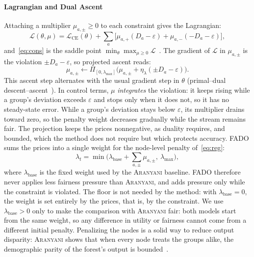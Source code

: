 \documentclass[conference]{IEEEtran}
\newcommand{\fado}{\textsc{FADO}}
\newcommand{\ara}{\textsc{Aranyani}}
\begin{document}
\paragraph*{Lagrangian and Dual Ascent}
Attaching a multiplier $\mu_{a,\pm}\ge0$ to each constraint gives the Lagrangian:
\begin{equation}
\mathcal{L}(\theta,\mu)=\mathcal{L}_{\mathrm{CE}}(\theta)+\sum_{a}\Big[\mu_{a,+}(D_a-\varepsilon)+\mu_{a,-}(-D_a-\varepsilon)\Big],
\end{equation}
and~\eqref{eq:cons} is the saddle point $\min_\theta\max_{\mu\ge0}\mathcal{L}$~\cite{boyd2004convex}. The gradient of $\mathcal{L}$ in $\mu_{a,\pm}$ is the
violation $\pm D_a-\varepsilon$, so projected ascent reads:
\begin{equation}
\mu_{a,\pm}\leftarrow\Pi_{[0,\lambda_{\max}]}\big(\mu_{a,\pm}+\eta_\lambda(\pm D_a-\varepsilon)\big).
\label{eq:dual}
\end{equation}
This ascent step alternates with the usual gradient step in $\theta$ (primal--dual descent--ascent~\cite{mahdavi2012trading}). In control terms, $\mu$ \emph{integrates} the
violation: it keeps rising while a group's deviation exceeds $\varepsilon$ and stops only when it does not, so it has no steady-state error. 
While a group's deviation stays below $\varepsilon$, its multiplier drains toward zero, so the penalty weight decreases gradually while the stream remains fair.
The projection keeps the prices nonnegative, as duality
requires, and bounded, which the method does not require but which protects accuracy. \fado{} sums the prices into a single weight for the node-level penalty of~\eqref{eq:reg}:
\begin{equation}
\lambda_t=\min\Big(\lambda_{\mathrm{base}}+\sum_{a,\pm}\mu_{a,\pm},\ \lambda_{\max}\Big),
\label{eq:lambda}
\end{equation}
where $\lambda_{\mathrm{base}}$ is the fixed weight used by the \ara{} baseline. \fado{} therefore never applies less fairness pressure than \ara{}, and adds
pressure only while the constraint is violated. The floor is not needed by the method: with $\lambda_{\mathrm{base}}=0$, the weight is set entirely by the
prices, that is, by the constraint. We use $\lambda_{\mathrm{base}}>0$ only to make the comparison with \ara{} fair: both models start from the same weight, so
any difference in utility or fairness cannot come from a different initial penalty. Penalizing the nodes is a solid way to reduce output disparity: \ara{} shows that when every node treats the
groups alike, the demographic parity of the forest's output is bounded~\cite[Lemma~1]{chowdhury2024enhancing}.
\end{document}
